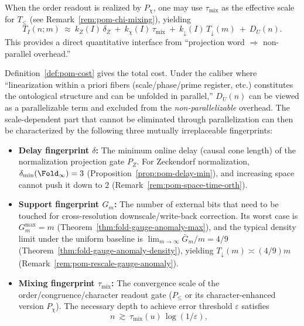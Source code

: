 \begin{remark}\label{rem:pom-cost-chi}
When the order readout is realized by $P_\chi$, one may use $\tau_{\mathrm{mix}}$ as the effective scale for $T_{\le}$ (see Remark~\ref{rem:pom-chi-mixing}), yielding
\[
T_I(n;m)\ \approx\ k_Z(I)\,\delta_Z\ +\ k_\chi(I)\,\tau_{\mathrm{mix}}\ +\ k_{\downarrow}(I)\,T_{\downarrow}(m)\ +\ D_U(n).
\]
This provides a direct quantitative interface from ``projection word $\Rightarrow$ non-parallel overhead.''
\end{remark}

\begin{remark}\label{rem:pom-nonparallel-three-meters}
Definition~\ref{def:pom-cost} gives the total cost.
Under the caliber where ``linearization within a priori fibers (scale/phase/prime register, etc.) constitutes the ontological structure and can be unfolded in parallel,'' $D_U(n)$ can be viewed as a parallelizable term and excluded from the \emph{non-parallelizable} overhead.
The scale-dependent part that cannot be eliminated through parallelization can then be characterized by the following three mutually irreplaceable fingerprints:
\begin{itemize}
  \item \textbf{Delay fingerprint \(\delta\):} The minimum online delay (causal cone length) of the normalization projection gate \(P_Z\). For Zeckendorf normalization,
  \(\delta_{\min}(\Fold_\infty)=3\) (Proposition~\ref{prop:pom-delay-min}), and increasing space cannot push it down to \(2\) (Remark~\ref{rem:pom-space-time-orth}).
  \item \textbf{Support fingerprint \(G_m\):} The number of external bits that need to be touched for cross-resolution downscale/write-back correction. Its worst case is \(G_m^{\max}=m\) (Theorem~\ref{thm:fold-gauge-anomaly-max}), and the typical density limit under the uniform baseline is
  \(\lim_{m\to\infty}\bar G_m/m=4/9\) (Theorem~\ref{thm:fold-gauge-anomaly-density}), yielding \(T_{\downarrow}(m)\asymp (4/9)m\) (Remark~\ref{rem:pom-rescale-gauge-anomaly}).
  \item \textbf{Mixing fingerprint \(\tau_{\mathrm{mix}}\):} The convergence scale of the order/congruence/character readout gate (\(P_{\le}\) or its character-enhanced version \(P_\chi\)). The necessary depth to achieve error threshold \(\varepsilon\) satisfies
  \[
  n\ \gtrsim\ \tau_{\mathrm{mix}}(u)\,\log(1/\varepsilon),
\]
\end{itemize}
\end{remark}
